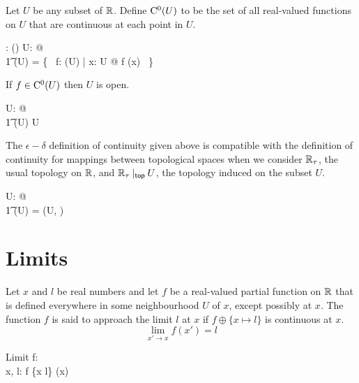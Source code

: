 \documentclass[11pt, oneside]{article}
\begin{document}
Let $U$ be any subset of $\mathbb{R}$. 
Define $\operatorname{C^0}(U)$ to be the set of all real-valued functions on $U$ that are continuous at each point in $U$.

\begin{axdef}
	\CzeroPR: \power \R \fun \power (\R \pfun \R)
\where
	\forall U: \power \R @ \\
	\t1	\CzeroPR(U) = \{~ f: \FunPR(U) | \forall x: U @ f \in   \CzeroR(x) ~\}
\end{axdef}

\begin{remark}
If $f \in \operatorname{C^0}(U)$ then $U$ is open.

\begin{zed}
	\forall U: \power \R @ \\
	\t1	\CzeroPR(U) \neq \emptyset \implies U \in \openR
\end{zed}

\end{remark}

\begin{remark}
The $\epsilon-\delta$ definition of continuity given above is compatible with the definition
of continuity for mappings between topological spaces when we consider $\mathbb{R}_\tau$, the usual topology on $\mathbb{R}$,
and $\mathbb{R}_\tau \mathbin{|_{\mathsf{top}}} U$, the topology induced on the subset $U$.

\begin{zed}
	\forall U: \openR @ \\
	\t1	\CzeroPR(U) = \CzeroTT(\Rtau \inducedTopSp U, \Rtau)
\end{zed}

\end{remark}

\section{Limits}

Let $x$ and $l$ be real numbers and
let $f$ be a real-valued partial function on $\mathbb{R}$ that is defined everywhere in some
neighbourhood $U$ of $x$, except possibly at $x$.
The function $f$ is said to approach the limit $l$ at $x$ if $f \oplus \{ x \mapsto l \}$ is continuous at $x$.
$$
	\lim_{x' \to x}{f(x')} = l
$$

\begin{schema}{Limit}
	f: \R \pfun \R \\
	x, l: \R
\where
	f \oplus \{x \mapsto l\} \in \CzeroR(x)
\end{schema}

\subsection{}
\end{document}

